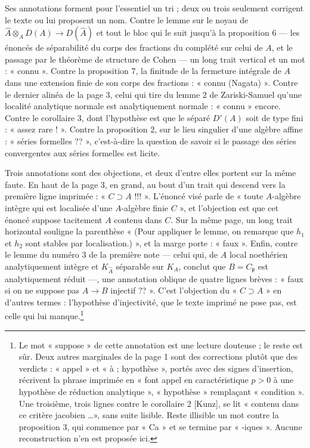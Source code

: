 \documentclass[11pt,a4paper]{article}
\begin{document}
Ses annotations forment pour l'essentiel un tri ; deux ou trois seulement
corrigent le texte ou lui proposent un nom. Contre le
lemme sur le noyau de $\hat{A} \otimes_A D(A) \to D(\hat{A})$ et tout le bloc
qui le suit jusqu'à la proposition 6 — les énoncés de séparabilité du corps des
fractions du complété sur celui de $A$, et le passage par le théorème de
structure de Cohen — un long trait vertical et un mot : « connu ». Contre la
proposition 7, la finitude de la fermeture intégrale de $A$ dans une extension
finie de son corps des fractions : « connu (Nagata) ». Contre le dernier alinéa
de la page 3, celui qui tire du lemme 2 de Zariski-Samuel qu'une localité
analytique normale est analytiquement normale : « connu » encore. Contre le
corollaire 3, dont l'hypothèse est que le séparé $D'(A)$ soit de type fini :
« assez rare ! ». Contre la proposition 2, sur le lieu singulier d'une algèbre
affine : « séries formelles ?? », c'est-à-dire la question de savoir si le
passage des séries convergentes aux séries formelles est licite.

Trois annotations sont des objections, et deux d'entre elles portent sur la
même faute. En haut de la page 3, en grand, au bout d'un trait qui descend vers
la première ligne imprimée : « $C \supset A$ !!! ». L'énoncé visé parle de
« toute $A$-algèbre intègre qui est localisée d'une $A$-algèbre finie $C$ », et
l'objection est que cet énoncé suppose tacitement $A$ contenu dans $C$. Sur la
même page, un long trait horizontal souligne la parenthèse « (Pour appliquer le
lemme, on remarque que $h_1$ et $h_2$ sont stables par localisation.) », et la
marge porte : « faux ». Enfin, contre le lemme du numéro 3 de la première note
— celui qui, de $A$ local noethérien analytiquement intègre et
$K_{\hat{A}}$ séparable sur $K_A$, conclut que $B = C_{\mathfrak{p}}$ est
analytiquement réduit —, une annotation oblique de quatre lignes brèves :
« faux si on ne suppose pas $A \to B$ injectif ?? ». C'est l'objection du
« $C \supset A$ » en d'autres termes : l'hypothèse d'injectivité, que le texte
imprimé ne pose pas, est celle qui lui manque.\footnote{Le mot « suppose » de
cette annotation est une lecture douteuse ; le reste est sûr. Deux autres
marginales de la page 1 sont des corrections plutôt que des verdicts : « appel »
et « à ; hypothèse », portés avec des signes d'insertion, récrivent la phrase
imprimée en « font appel en caractéristique $p > 0$ à une hypothèse de
réduction analytique », « hypothèse » remplaçant « condition ». Une troisième,
trois lignes contre le corollaire 2 [Kunz], se lit « contenu dans ce critère
jacobien \ldots », sans suite lisible. Reste illisible un mot contre la
proposition 3, qui commence par « Ca » et se termine par « -iques ». Aucune
reconstruction n'en est proposée ici.}
\end{document}
